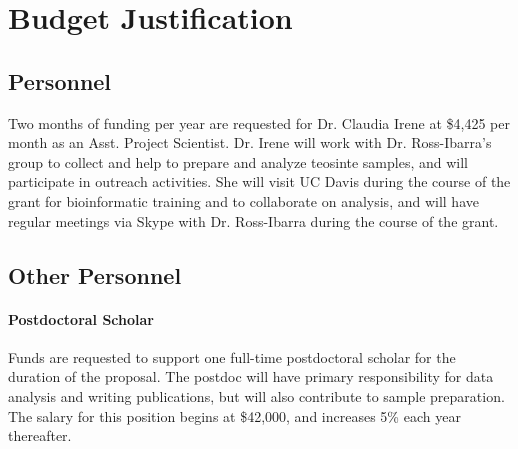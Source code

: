 \documentclass[11pt,letterpaper]{article}
\newcommand{\required}[1]{\section*{\hfil #1\hfil}}                    %
\begin{document}
\setcounter{page}{1}

\required{Budget Justification}

\subsection*{Personnel}

Two months of funding per year are requested for Dr. Claudia Irene at \$4,425 per month as an Asst. Project Scientist. Dr. Irene will work with Dr. Ross-Ibarra's group to collect and help to prepare and analyze teosinte samples, and will participate in outreach activities.  She will visit UC Davis during the course of the grant for bioinformatic training and to collaborate on analysis, and will have regular meetings via Skype with Dr. Ross-Ibarra during the course of the grant.

\subsection*{Other Personnel}
\paragraph{Postdoctoral Scholar}
Funds are requested to support one full-time postdoctoral scholar for the duration of the proposal. The postdoc will have primary responsibility for data analysis and writing publications, but will also contribute to sample preparation. The salary for this position begins at \$42,000, and increases 5\% each year thereafter.


\end{document}
